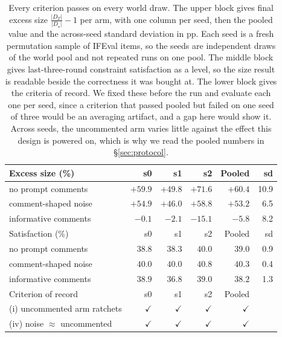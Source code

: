 \begin{table}[t]
  \centering\small
  \begin{tabularx}{\textwidth}{@{}>{\raggedright\arraybackslash}Xrrrrr@{}}
    \toprule
    Excess size (\%) & s0 & s1 & s2 & Pooled & sd \\
    \midrule
    no prompt comments & $+59.9$ & $+49.8$ & $+71.6$ & $+60.4$ & 10.9 \\
    comment-shaped noise & $+54.9$ & $+46.0$ & $+58.8$ & $+53.2$ & 6.5 \\
    informative comments & $-0.1$ & $-2.1$ & $-15.1$ & $-5.8$ & 8.2 \\
    \midrule
    Satisfaction (\%) & s0 & s1 & s2 & Pooled & sd \\
    \midrule
    no prompt comments & $38.8$ & $38.3$ & $40.0$ & $39.0$ & 0.9 \\
    comment-shaped noise & $40.0$ & $40.0$ & $40.8$ & $40.3$ & 0.4 \\
    informative comments & $38.9$ & $36.8$ & $39.0$ & $38.2$ & 1.3 \\
    \midrule
    Criterion of record & s0 & s1 & s2 & Pooled & \\
    \midrule
    (i) uncommented arm ratchets & $\checkmark$ & $\checkmark$ & $\checkmark$ & $\checkmark$ & \\
    (iv) noise $\approx$ uncommented & $\checkmark$ & $\checkmark$ & $\checkmark$ & $\checkmark$ & \\
    \bottomrule
  \end{tabularx}
  \caption{
    Every criterion passes on every world draw. The upper block gives final excess size
    $\frac{|D_T|}{|D_\star|}{-}1$ per arm, with one column per seed, then the pooled value and the
    across-seed standard deviation in pp. Each seed is a fresh permutation sample of IFEval
    items, so the seeds are independent draws of the world pool and not repeated runs on one pool.
    The middle block gives last-three-round constraint satisfaction as a level, so the size result
    is readable beside the correctness it was bought at. The lower block gives the criteria of
    record. We fixed these before the run and evaluate
    each one per seed, since a criterion that passed pooled but failed on one seed of three would
    be an averaging artifact, and a gap here would show it. Across seeds, the uncommented arm varies little
    against the effect this design is powered on, which is why we read the pooled numbers in
    \S\ref{sec:protocol}.
  }
  \label{tab:seeds}
\end{table}
